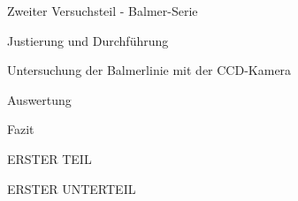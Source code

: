 \documentclass[pdftex, a4paper,11pt, twoside, ngerman]{report}
\begin{document}
\begin{chapter}{Zweiter Versuchsteil - Balmer-Serie}
\begin{section}{Justierung und Durchführung}
\begin{subsection}{Untersuchung der Balmerlinie mit der CCD-Kamera}
      \end{subsection}

    \end{section}
    
    
    
    \begin{section}{Auswertung}
      \label{chp:Balmer:sec:Auswertung}
      
    \end{section}
    
    
    
    \begin{section}{Fazit}
      \label{chp:Balmer:sec:Fazit}
      
    \end{section}
    
  \end{chapter}
  
  
  \begin{appendix}
    \label{Anhang}
    
    
    
    \begin{chapter}{ERSTER TEIL}
      \label{Anhang:chp:ERSTERTEIL}
      
      
      
      \begin{section}{ERSTER UNTERTEIL}
        \label{Anhang:chp:ERSTERTEIL:sec:UNTERTEIL}
       
       
       
      \end{section}
      
      
    \end{chapter}
    
  \end{appendix}
  
\end{document}
